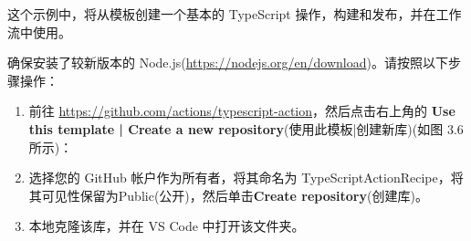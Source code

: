 
这个示例中，将从模板创建一个基本的 TypeScript 操作，构建和发布，并在工作流中使用。


确保安装了较新版本的 Node.js(\url{https://nodejs.org/en/download})。请按照以下步骤操作：

\begin{enumerate}
\item 
前往 \url{https://github.com/actions/typescript-action}，然后点击右上角的 \textbf{Use this template | Create a new repository}(使用此模板|创建新库)(如图 3.6 所示)：


\item 
选择您的 GitHub 帐户作为所有者，将其命名为 TypeScriptActionRecipe，将其可见性保留为Public(公开)，然后单击\textbf{Create repository}(创建库)。

\item 
本地克隆该库，并在 VS Code 中打开该文件夹。
\end{enumerate}


